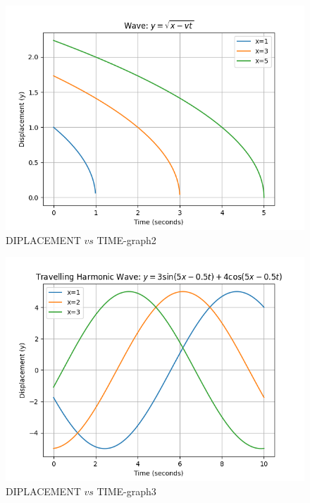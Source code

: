 \documentclass[journal,12pt,twocolumn]{IEEEtran}
\theoremstyle{remark}
\begin{document}
\begin{figure}[ht]
                            \centering
                            \includegraphics[width=\columnwidth]{figs/b.png}
                            \caption{DIPLACEMENT $vs$ TIME-graph2}
                            \label{fig:2}
\end{figure}   
\begin{figure}[ht]
                             \centering
                             \includegraphics[width=\columnwidth]{figs/c.png}
                             \caption{DIPLACEMENT $vs$ TIME-graph3}
                             \label{fig:3}
\end{figure}
\end{document}
